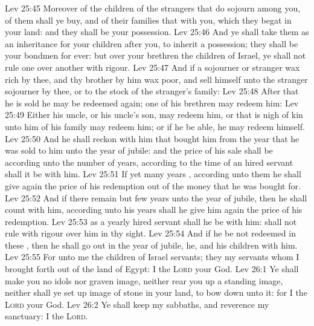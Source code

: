 \vs Lev 25:45 Moreover of the children of the strangers that do sojourn among you, of them shall ye buy, and of their families that  with you, which they begat in your land: and they shall be your possession.
\vs Lev 25:46 And ye shall take them as an inheritance for your children after you, to inherit  a possession; they shall be your bondmen for ever: but over your brethren the children of Israel, ye shall not rule one over another with rigour.
\vs Lev 25:47 And if a sojourner or stranger wax rich by thee, and thy brother  by him wax poor, and sell himself unto the stranger  sojourner by thee, or to the stock of the stranger's family:
\vs Lev 25:48 After that he is sold he may be redeemed again; one of his brethren may redeem him:
\vs Lev 25:49 Either his uncle, or his uncle's son, may redeem him, or  that is nigh of kin unto him of his family may redeem him; or if he be able, he may redeem himself.
\vs Lev 25:50 And he shall reckon with him that bought him from the year that he was sold to him unto the year of jubile: and the price of his sale shall be according unto the number of years, according to the time of an hired servant shall it be with him.
\vs Lev 25:51 If  yet many years , according unto them he shall give again the price of his redemption out of the money that he was bought for.
\vs Lev 25:52 And if there remain but few years unto the year of jubile, then he shall count with him,  according unto his years shall he give him again the price of his redemption.
\vs Lev 25:53  as a yearly hired servant shall he be with him:  shall not rule with rigour over him in thy sight.
\vs Lev 25:54 And if he be not redeemed in these , then he shall go out in the year of jubile,  he, and his children with him.
\vs Lev 25:55 For unto me the children of Israel  servants; they  my servants whom I brought forth out of the land of Egypt: I  the \textsc{Lord} your God.
\vs Lev 26:1 Ye shall make you no idols nor graven image, neither rear you up a standing image, neither shall ye set up  image of stone in your land, to bow down unto it: for I  the \textsc{Lord} your God.
\vs Lev 26:2 Ye shall keep my sabbaths, and reverence my sanctuary: I  the \textsc{Lord}.
